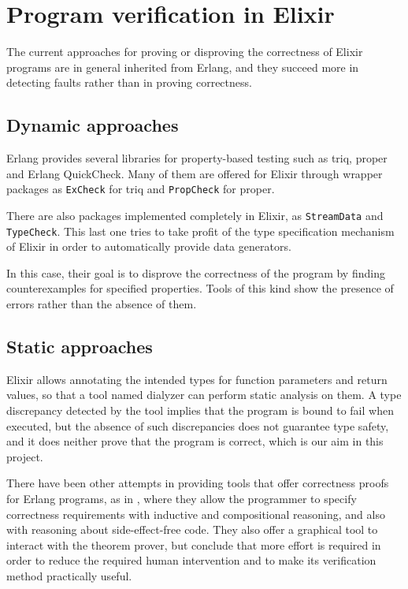 \section{Program verification in Elixir}

The current approaches for proving or disproving the correctness of Elixir 
programs are in general inherited from Erlang, and they succeed more in 
detecting faults rather than in proving correctness.

\subsection{Dynamic approaches}

Erlang provides several libraries for property-based testing such as \gls{triq},
\gls{proper} and Erlang QuickCheck. Many of them are offered for Elixir through
wrapper packages as \verb|ExCheck| for \gls{triq} and \verb|PropCheck| for
\gls{proper}.

There are also packages implemented completely in Elixir, as \verb|StreamData|
and \verb|TypeCheck|. This last one tries to take profit of the type
specification mechanism of Elixir in order to automatically provide data
generators.

In this case, their goal is to disprove the correctness of the program by
finding counterexamples for specified properties. Tools of this kind show the
presence of errors rather than the absence of them.

\subsection{Static approaches}
\label{sec:static}

Elixir allows annotating the intended types for function parameters and return
values, so that a tool named \gls{dialyzer} \citep{Dialyzer} can perform static
analysis on them. A type discrepancy detected by the tool implies that the
program is bound to fail when executed, but the absence of such discrepancies
does not guarantee type safety, and it does neither prove that the program is
correct, which is our aim in this project.

There have been other attempts in providing tools that offer correctness proofs
for Erlang programs, as in \cite{erlangveri}, where they allow the programmer to
specify correctness requirements with inductive and compositional reasoning, and
also with reasoning about side-effect-free code. They also offer a graphical
tool to interact with the theorem prover, but conclude that more effort is
required in order to reduce the required human intervention and to make its
verification method practically useful.
